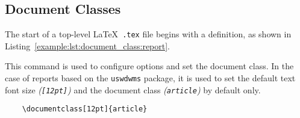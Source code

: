 \subsection{Document Classes}
The start of a top-level \LaTeX\ \texttt{.tex} file begins with a  definition, as shown in Listing~\ref{example:lst:document_class:report}.

This command is used to configure options and set the document class. In the case of reports based on the \texttt{uswdwms} package, it is used to set the default text font size \textit{(\texttt{[12pt]})} and the document class \textit{(\texttt{article})} by default only.


\begin{listing}[H]
  \captionsetup{skip=\skiplistingcaptionlen}
  \begin{verbatim}
    \documentclass[12pt]{article}
  \end{verbatim}
  \caption{\LaTeX\ \texttt{\textbackslash documentclass} command example}
  \label{example:lst:document_class:report}
\end{listing}
